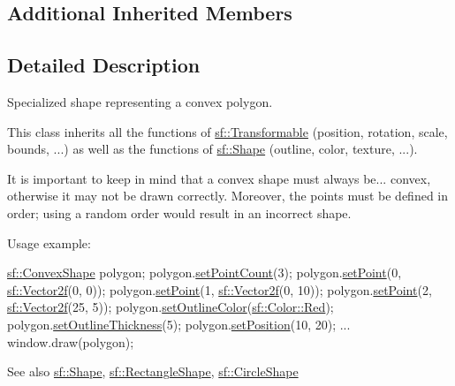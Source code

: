 \subsection*{Additional Inherited Members}


\subsection{Detailed Description}
Specialized shape representing a convex polygon. 

This class inherits all the functions of \hyperlink{classsf_1_1_transformable}{sf\+::\+Transformable} (position, rotation, scale, bounds, ...) as well as the functions of \hyperlink{classsf_1_1_shape}{sf\+::\+Shape} (outline, color, texture, ...).

It is important to keep in mind that a convex shape must always be... convex, otherwise it may not be drawn correctly. Moreover, the points must be defined in order; using a random order would result in an incorrect shape.

Usage example\+: 
\begin{DoxyCode}
\hyperlink{classsf_1_1_convex_shape}{sf::ConvexShape} polygon;
polygon.\hyperlink{classsf_1_1_convex_shape_aea7c3f0f08f5cd457fe128a75b7c1e70}{setPointCount}(3);
polygon.\hyperlink{classsf_1_1_convex_shape_ae5c7f87d0e776952e2ec6f0aa12ded31}{setPoint}(0, \hyperlink{classsf_1_1_vector2}{sf::Vector2f}(0, 0));
polygon.\hyperlink{classsf_1_1_convex_shape_ae5c7f87d0e776952e2ec6f0aa12ded31}{setPoint}(1, \hyperlink{classsf_1_1_vector2}{sf::Vector2f}(0, 10));
polygon.\hyperlink{classsf_1_1_convex_shape_ae5c7f87d0e776952e2ec6f0aa12ded31}{setPoint}(2, \hyperlink{classsf_1_1_vector2}{sf::Vector2f}(25, 5));
polygon.\hyperlink{classsf_1_1_shape_a5978f41ee349ac3c52942996dcb184f7}{setOutlineColor}(\hyperlink{classsf_1_1_color_a127dbf55db9c07d0fa8f4bfcbb97594a}{sf::Color::Red});
polygon.\hyperlink{classsf_1_1_shape_a5ad336ad74fc1f567fce3b7e44cf87dc}{setOutlineThickness}(5);
polygon.\hyperlink{classsf_1_1_transformable_a4dbfb1a7c80688b0b4c477d706550208}{setPosition}(10, 20);
...
window.draw(polygon);
\end{DoxyCode}


\begin{DoxySeeAlso}{See also}
\hyperlink{classsf_1_1_shape}{sf\+::\+Shape}, \hyperlink{classsf_1_1_rectangle_shape}{sf\+::\+Rectangle\+Shape}, \hyperlink{classsf_1_1_circle_shape}{sf\+::\+Circle\+Shape} 
\end{DoxySeeAlso}


